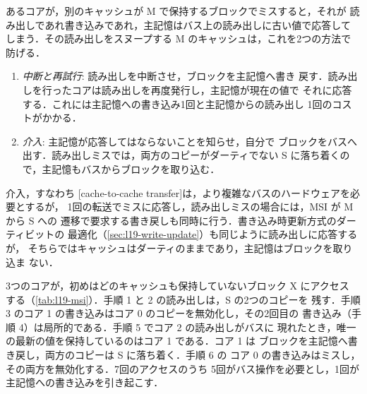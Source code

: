 \documentclass[../main.tex]{subfiles}
\begin{document}
あるコアが，別のキャッシュが M で保持するブロックでミスすると，それが
読み出しであれ書き込みであれ，主記憶はバス上の読み出しに古い値で応答して
しまう．その読み出しをスヌープする M のキャッシュは，これを2つの方法で
防げる．
\begin{enumerate}
  \item \emph{中断と再試行}: 読み出しを中断させ，ブロックを主記憶へ書き
    戻す．読み出しを行ったコアは読み出しを再度発行し，主記憶が現在の値で
    それに応答する．これには主記憶への書き込み1回と主記憶からの読み出し
    1回のコストがかかる．
  \item \emph{介入}: 主記憶が応答してはならないことを知らせ，自分で
    ブロックをバスへ出す．読み出しミスでは，両方のコピーがダーティでない
    S に落ち着くので，主記憶もバスからブロックを取り込む．
\end{enumerate}
介入，すなわち%
[cache-to-cache transfer]は，より複雑なバスのハードウェアを必要とするが，
1回の転送でミスに応答し，読み出しミスの場合には，MSI が M から S への
遷移で要求する書き戻しも同時に行う．書き込み時更新方式のダーティビットの
最適化（\cref{sec:l19-write-update}）も同じように読み出しに応答するが，
そちらではキャッシュはダーティのままであり，主記憶はブロックを取り込ま
ない．

\begin{example}
  \label{ex:l19-msi}
  3つのコアが，初めはどのキャッシュも保持していないブロック X にアクセス
  する（\cref{tab:l19-msi}）．手順 1 と 2 の読み出しは，S の2つのコピーを
  残す．手順 3 のコア 1 の書き込みはコア 0 のコピーを無効化し，その2回目の
  書き込み（手順 4）は局所的である．手順 5 でコア 2 の読み出しがバスに
  現れたとき，唯一の最新の値を保持しているのはコア 1 である．コア 1 は
  ブロックを主記憶へ書き戻し，両方のコピーは S に落ち着く．手順 6 の
  コア 0 の書き込みはミスし，その両方を無効化する．7回のアクセスのうち
  5回がバス操作を必要とし，1回が主記憶への書き込みを引き起こす．
\end{example}
\end{document}
